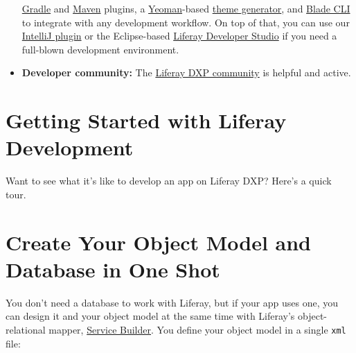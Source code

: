 \begin{itemize}
  \href{/docs/7-2/reference/-/knowledge_base/r/gradle-plugins}{Gradle}
  and \href{/docs/7-2/reference/-/knowledge_base/r/maven-plugins}{Maven}
  plugins, a \href{http://yeoman.io/}{Yeoman}-based
  \href{/docs/7-2/reference/-/knowledge_base/r/theme-generator}{theme
  generator}, and
  \href{/docs/7-2/reference/-/knowledge_base/r/blade-cli}{Blade CLI} to
  integrate with any development workflow. On top of that, you can use
  our \href{/docs/7-2/reference/-/knowledge_base/r/intellij}{IntelliJ
  plugin} or the Eclipse-based
  \href{/docs/7-2/reference/-/knowledge_base/r/liferay-dev-studio}{Liferay
  Developer Studio} if you need a full-blown development environment.
\item
  \textbf{Developer community:} The \href{https://liferay.dev}{Liferay
  DXP community} is helpful and active.
\end{itemize}

\section{Getting Started with Liferay
Development}\label{getting-started-with-liferay-development}

Want to see what it's like to develop an app on Liferay DXP? Here's a
quick tour.

\section{Create Your Object Model and Database in One
Shot}\label{create-your-object-model-and-database-in-one-shot}

You don't need a database to work with Liferay, but if your app uses
one, you can design it and your object model at the same time with
Liferay's object-relational mapper,
\href{/docs/7-2/appdev/-/knowledge_base/a/service-builder}{Service
Builder}. You define your object model in a single \texttt{xml} file:

